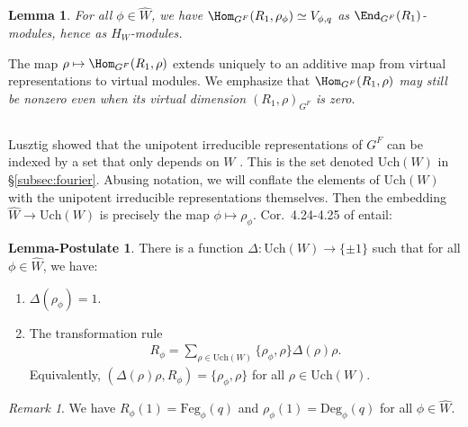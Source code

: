 \documentclass[a4paper,10pt,leqno]{amsart}
\theoremstyle{plain}
\theoremstyle{plain}
\theoremstyle{plain}
\newtheorem{lem}[thm]{Lemma}
\theoremstyle{definition}
\newtheorem{lempost}[thm]{Lemma-Postulate}
\theoremstyle{remark}
\newtheorem{rem}[thm]{Remark}
\newcommand{\UCh}{\mathrm{Uch}}
\newcommand{\UDeg}{\mathrm{Deg}}
\newcommand{\FDeg}{\mathrm{Feg}}
\begin{document}
\begin{lem}\label{lem:restriction}
For all $\phi \in \hat{W}$, we have $\Hom_{G^F}(R_1, \rho_\phi) \simeq V_{\phi, q}$ as $\End_{G^F}(R_1)$-modules, hence as $H_W$-modules.
\end{lem}

The map $\rho \mapsto \Hom_{G^F}(R_1, \rho)$ extends uniquely to an additive map from virtual representations to virtual modules.
We emphasize that \emph{$\Hom_{G^F}(R_1, \rho)$ may still be nonzero even when its virtual dimension $(R_1, \rho)_{G^F}$ is zero}.

\subsection{}

Lusztig showed that the unipotent irreducible representations of $G^F$ can be indexed by a set that only depends on $W$ \cite[Ch.\ 4]{lusztig_1984}.
This is the set denoted $\UCh(W)$ in \S\ref{subsec:fourier}.
Abusing notation, we will conflate the elements of $\UCh(W)$ with the unipotent irreducible representations themselves.
Then the embedding $\hat{W} \to \UCh(W)$ is precisely the map $\phi \mapsto \rho_\phi$.
Cor.\ 4.24-4.25 of \cite{lusztig_1984} entail:

\begin{lempost}\label{lempost:almost}
There is a function $\Delta : \UCh(W) \to \{\pm 1\}$ such that  for all $\phi \in \hat{W}$, we have:
\begin{enumerate}
\item 	$\Delta(\rho_\phi) = 1$.
\item 	The transformation rule
\begin{align}
R_\phi
=	\sum_{\rho \in \UCh(W)}
{\{\rho_\phi, \rho\}}\Delta(\rho)\rho.
\end{align}
Equivalently, $(\Delta(\rho)\rho, R_\phi) = \{\rho_\phi, \rho\}$  for all $\rho \in \UCh(W)$.
\end{enumerate}
\end{lempost}

\begin{rem}
We have $R_\phi(1) = \FDeg_\phi(q)$ and $\rho_\phi(1) = \UDeg_\phi(q)$ for all $\phi \in \hat{W}$.
\end{rem}

\subsection{}
\end{document}
